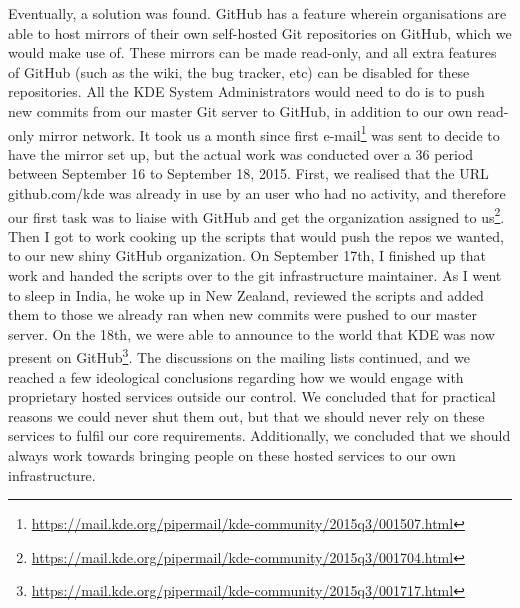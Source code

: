Eventually, a solution was found. GitHub has a feature wherein organisations are able to host mirrors of their own self-hosted Git repositories on GitHub, which we would make use of. These mirrors can be made read-only, and all extra features of GitHub (such as the wiki, the bug tracker, etc) can be disabled for these repositories. All the KDE System Administrators would need to do is to push new commits from our master Git server to GitHub, in addition to our own read-only mirror network.
It took us a month since first e-mail\footnote{\url{https://mail.kde.org/pipermail/kde-community/2015q3/001507.html}} was sent to decide to have the mirror set up, but the actual work was conducted over a 36 period between September 16 to September 18, 2015. First, we realised that the URL github.com/kde was already in use by an user who had no activity, and therefore our first task was to liaise with GitHub and get the organization assigned to us\footnote{\url{https://mail.kde.org/pipermail/kde-community/2015q3/001704.html}}. Then I got to work cooking up the scripts that would push the repos we wanted, to our new shiny GitHub organization. On September 17th, I finished up that work and handed the scripts over to the git infrastructure maintainer. As I went to sleep in India, he woke up in New Zealand, reviewed the scripts and added them to those we already ran when new commits were pushed to our master server. On the 18th, we were able to announce to the world that KDE was now present on GitHub\footnote{\url{https://mail.kde.org/pipermail/kde-community/2015q3/001717.html}}.
The discussions on the mailing lists continued, and we reached a few ideological conclusions regarding how we would engage with proprietary hosted services outside our control. We concluded that for practical reasons we could never shut them out, but that we should never rely on these services to fulfil our core requirements. Additionally, we concluded that we should always work towards bringing people on these hosted services to our own infrastructure.

